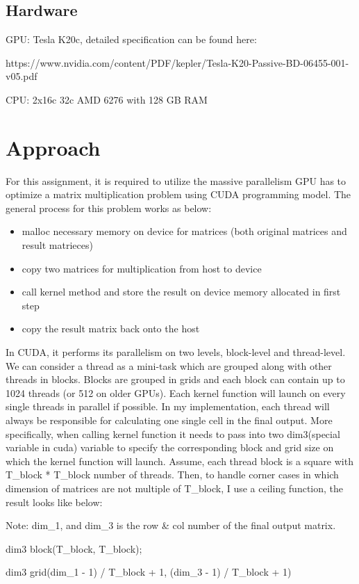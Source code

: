 \documentclass{cs4444}
\begin{document}
\subsection{Hardware}
	GPU: Tesla K20c, detailed specification can be found here:
	
	https://www.nvidia.com/content/PDF/kepler/Tesla-K20-Passive-BD-06455-001-v05.pdf
	
	CPU: 2x16c 32c AMD 6276 with 128 GB RAM
	
\section{Approach}
	For this assignment, it is required to utilize the massive parallelism GPU has to optimize a matrix multiplication problem using CUDA programming model. The general process for this problem works as below:
	\begin{itemize}
		\item malloc necessary memory on device for matrices (both original matrices and result matrieces)
		\item copy two matrices for multiplication from host to device
		\item call kernel method and store the result on device memory allocated in first step
		\item copy the result matrix back onto the host
	\end{itemize}

	In CUDA, it performs its parallelism on two levels, block-level and thread-level. We can consider a thread as a mini-task which are grouped along with other threads in blocks. Blocks are grouped in grids and each block can contain up to 1024 threads (or 512 on older GPUs). Each kernel function will launch on every single threads in parallel if possible. In my implementation, each thread will always be responsible for calculating one single cell in the final output. More specifically, when calling kernel function it needs to pass into two dim3(special variable in cuda) variable to specify the corresponding block and grid size on which the kernel function will launch. Assume, each thread block is a square with T\_block * T\_block number of threads. Then, to handle corner cases in which dimension of matrices are not multiple of T\_block, I use a ceiling function, the result looks like below: 
	
	Note: dim\_1, and dim\_3 is the row \& col number of the final output matrix.
	
	\begin{center}
		dim3 block(T\_block, T\_block);
		
		dim3 grid(dim\_1 - 1) / T\_block + 1, (dim\_3 - 1) / T\_block + 1)	
		
	\end{center}
	 
\end{document}

